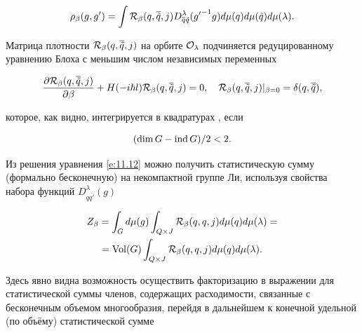 \begin{equation}\label{e:11.14}

\rho_{\beta}(g,g')=\int {\cal R}_{\beta}(q,\overline{\tilde q},j) D^{\lambda}_{\overline{q} \tilde

q}({g'}^{-1}g)d\mu(q) d\mu(\tilde q) d\mu(\lambda).

\end{equation}

Матрица плотности ${\cal R}_{\beta}(q,\overline{\tilde q},j)$ на орбите $\cal O_{\lambda}$ подчиняется редуцированному уравнению Блоха с меньшим числом независимых переменных

\begin{equation}\label{e:11.12}

\frac{\partial {\cal R}_{\beta}(q,\overline{\tilde q},j)}{\partial \beta}+ H(-i \hbar l)

{\cal R}_{\beta}(q,\overline{\tilde q},j) = 0, \quad {\cal R}_{\beta}(q,\overline{\tilde

q},j)|_{\beta=0}= \delta(q,\overline{\tilde q}),

\end{equation}

которое, как видно, интегрируется в квадратурах \cite{mikh:bib:BMS2}, если

\begin{equation}

(\dim G - {\rm ind}\, G)/2 < 2.

\end{equation}



Из решения уравнения \eqref{e:11.12} можно получить статистическую сумму (формально бесконечную) на некомпактной группе Ли, используя свойства набора функций $D^{\lambda}_{q \overline{q'}}(g)$

\begin{multline}\label{e:11.15}

Z_{\beta}= \int_{G} d\mu(g) \int_{Q \times J} {\cal R}_{\beta}(q,q,j) d\mu(q)

d\mu(\lambda)  = \\ =  \mathop{\rm Vol}(G) \int_{Q \times J} {\cal R}_{\beta}(q,q,j) d\mu(q) d\mu(\lambda).

\end{multline}

Здесь явно видна возможность осуществить факторизацию в выражении для статистической суммы членов, содержащих расходимости, связанные с бесконечным объемом многообразия, перейдя в дальнейшем к конечной удельной (по объёму) статистической сумме \cite{mikh:bib:MS1,mikh:bib:MS2}

